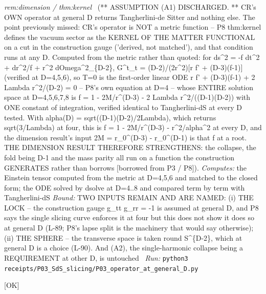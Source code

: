 \begin{description}
\textit{rem:dimension / thm:kernel} \ (** ASSUMPTION (A1) DISCHARGED. ** CR's OWN operator at general D returns Tangherlini-de Sitter and nothing else. The point previously missed: CR's operator is NOT a metric function -- P8 thm:kernel defines the vacuum sector as the KERNEL OF THE MATTER FUNCTIONAL on a cut in the construction gauge ('derived, not matched'), and that condition runs at any D. Computed from the metric rather than quoted: for ds\textasciicircum{}2 = -f dt\textasciicircum{}2 + dr\textasciicircum{}2/f + r\textasciicircum{}2 dOmega\textasciicircum{}2\_\{D-2\}, G\textasciicircum{}t\_t = (D-2)/(2r\textasciicircum{}2)[r f' + (D-3)(f-1)] (verified at D=4,5,6), so T=0 is the first-order linear ODE r f' + (D-3)(f-1) + 2 Lambda r\textasciicircum{}2/(D-2) = 0 -- P8's own equation at D=4 -- whose ENTIRE solution space at D=4,5,6,7,8 is f = 1 - 2M/r\textasciicircum{}(D-3) - 2 Lambda r\textasciicircum{}2/((D-1)(D-2)) with ONE constant of integration, verified identical to Tangherlini-dS at every D tested. With alpha(D) = sqrt((D-1)(D-2)/2Lambda), which returns sqrt(3/Lambda) at four, this is f = 1 - 2M/r\textasciicircum{}(D-3) - r\textasciicircum{}2/alpha\textasciicircum{}2 at every D, and the dimension result's input 2M = r\_0\textasciicircum{}(D-3) - r\_0\textasciicircum{}(D-1) is that f at a root. THE DIMENSION RESULT THEREFORE STRENGTHENS: the collapse, the fold being D-1 and the mass parity all run on a function the construction GENERATES rather than borrows [borrowed from P3 / P8]). 
\emph{Computes:} the Einstein tensor computed from the metric at D=4,5,6 and matched to the closed form; the ODE solved by dsolve at D=4..8 and compared term by term with Tangherlini-dS
 \emph{Bound:} TWO INPUTS REMAIN AND ARE NAMED: (i) THE LOCK -- the construction gauge g\_tt g\_rr = -1 is assumed at general D, and P8 says the single slicing curve enforces it at four but this does not show it does so at general D (L-89; P8's lapse split is the machinery that would say otherwise); (ii) THE SPHERE -- the transverse space is taken round S\textasciicircum{}\{D-2\}, which at general D is a choice (L-90). And (A2), the single-harmonic collapse being a REQUIREMENT at other D, is untouched
\ \emph{Run:} \texttt{python3 receipts/P03\_SdS\_slicing/P03\_operator\_at\_general\_D.py}
\item[\rcptlabel{P03_slate_worked}{P3R41}\textbf{P3R41}\quad\texttt{P03\_slate\_worked}]\hfill\textsf{[OK]}\\

\end{description}
